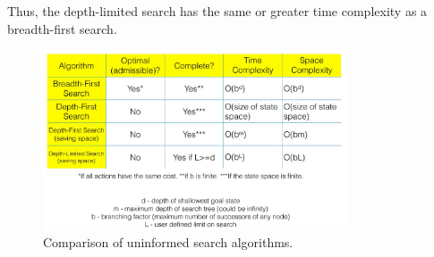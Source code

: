 Thus, the depth-limited search has the same or greater time complexity as a breadth-first search.

\begin{figure}[htp]
  \centering
  \includegraphics[width=0.8\textwidth]{unit-8/figures/uninformed-search-comparison.jpg}
  \caption*{Comparison of uninformed search algorithms.}
\end{figure}
